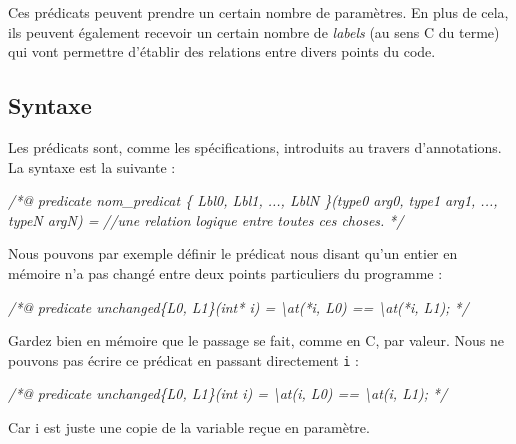 \documentclass[12pt,francais,]{scrbook}
\newenvironment{Shaded}{}{}
\newcommand{\CommentTok}[1]{\textcolor[rgb]{0.38,0.63,0.69}{\textit{{#1}}}}
\newcommand{\CommentTokAlt}[1]{\textcolor[rgb]{0.18,0.33,0.39}{\textit{{#1}}}}
\newenvironment{zdsalertblock}[1]{%
  \tcolorbox[beamer,%
    noparskip,breakable,
    colback=LightCoral,colframe=DarkRed,%
    colbacklower=Tomato,%
    title=#1]
}{\endtcolorbox}
\begin{document}
Ces prédicats peuvent prendre un certain nombre de paramètres. En plus
de cela, ils peuvent également recevoir un certain nombre de
\emph{labels} (au sens C du terme) qui vont permettre d'établir des
relations entre divers points du code.

\subsection{Syntaxe}\label{syntaxe}

Les prédicats sont, comme les spécifications, introduits au travers
d'annotations. La syntaxe est la suivante :

\begin{footnotesize}\begin{Shaded}
\begin{Highlighting}[]
\CommentTok{/*@}
\CommentTok{  predicate nom_predicat \{ Lbl0, Lbl1, ..., LblN \}(type0 arg0, type1 arg1, ..., typeN argN) =}
\CommentTok{    //une relation logique entre toutes ces choses.}
\CommentTok{*/}
\end{Highlighting}
\end{Shaded}\end{footnotesize}

Nous pouvons par exemple définir le prédicat nous disant qu'un entier en
mémoire n'a pas changé entre deux points particuliers du programme :

\begin{footnotesize}\begin{Shaded}
\begin{Highlighting}[]
\CommentTok{/*@}
\CommentTok{  predicate unchanged\{L0, L1\}(int* i) =}
\CommentTok{    \textbackslash{}at(*i, L0) == \textbackslash{}at(*i, L1);}
\CommentTok{*/}
\end{Highlighting}
\end{Shaded}\end{footnotesize}

\begin{zdsalertblock}{Attention}
  Gardez bien en mémoire que le passage
  se fait, comme en C, par valeur. Nous ne pouvons pas écrire
  ce prédicat en passant directement \texttt{i} :
  \begin{footnotesize}\begin{Shaded}
    \begin{Highlighting}[]
\CommentTokAlt{/*@}
\CommentTokAlt{  predicate unchanged\{L0, L1\}(int i) =}
\CommentTokAlt{    \textbackslash{}at(i, L0) == \textbackslash{}at(i, L1);}
\CommentTokAlt{*/}
    \end{Highlighting}
  \end{Shaded}\end{footnotesize}
  Car i est juste une copie de la variable reçue en paramètre.
\end{zdsalertblock}
\end{document}
